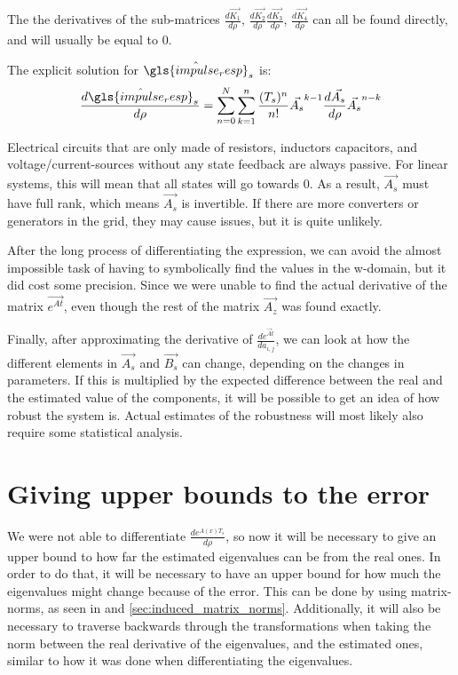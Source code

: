 The the derivatives of the sub-matrices $\frac{d \Vec{K_1}}{d \rho} $, $ \frac{d \Vec{K_2}}{d \rho}\frac{d \Vec{K_3}}{d \rho} $, $ \frac{d \Vec{K_4}}{d \rho}$ can all be found directly, and will usually be equal to 0.


The explicit solution for $\hat{\gls{impulse_resp}}_s$ is: 
\begin{equation}
 \frac{d \hat{\gls{impulse_resp}}_s}{d \rho} =
 \sum_{n=0}^N \sum_{k=1}^n \frac{(T_s)^n}{n!} \Vec{A_s}^{k-1} \frac{d \Vec{A_s}}{d \rho} \Vec{A_s}^{n-k}
\end{equation}


Electrical circuits that are only made of resistors, inductors capacitors, and voltage/current-sources without any state feedback are always passive. For linear systems, this will mean that all states will go towards 0. As a result, $\Vec{A_s}$ must have full rank, which means $\Vec{A_s}$ is invertible. If there are more converters or generators in the grid, they may cause issues, but it is quite unlikely. 


After the long process of differentiating the expression, we can avoid the almost impossible task of having to symbolically find the values in the w-domain, but it did cost some precision. Since we were unable to find the actual derivative of the matrix $\Vec{e^{At}}$, even though the rest of the matrix $\Vec{A_z}$ was found exactly. 


Finally, after approximating the derivative of $\frac{d e^{\Vec{A}t}}{d a_{i,j}}$, we can look at how the different elements in $\Vec{A_s}$ and $\Vec{B_s}$ can change, depending on the changes in parameters. If this is multiplied by the expected difference between the real and the estimated value of the components, it will be possible to get an idea of how robust the system is. Actual estimates of the robustness will most likely also require some statistical analysis. 


\section{Giving upper bounds to the error}
\label{sec:how_bad_can_it_go}
We were not able to differentiate $\frac{d e^{A(x) T_s}}{d \rho}$, so now it will be necessary to give an upper bound to how far the estimated eigenvalues can be from the real ones. In order to do that, it will be necessary to have an upper bound for how much the eigenvalues might change because of the error. This can be done by using matrix-norms, as seen in \cite{Triangle_inequality_source} and \cref{sec:induced_matrix_norms}. Additionally, it will also be necessary to traverse backwards through the transformations when taking the norm between the real derivative of the eigenvalues, and the estimated ones, similar to how it was done when differentiating the eigenvalues. 

